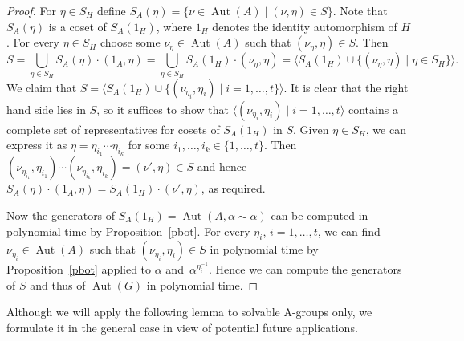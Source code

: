 \documentclass{article}
\DeclareMathOperator{\Aut}{Aut}
\begin{document}
\begin{proof}
	For \( \eta \in S_H \) define \( S_A(\eta) = \{ \nu \in \Aut(A) \mid (\nu, \eta) \in S \} \).
	Note that \( S_A(\eta) \) is a coset of \( S_A(1_H) \), where \( 1_H \) denotes the identity automorphism of \( H \).
	For every \( \eta \in S_H \) choose some \( \nu_\eta \in \Aut(A) \) such that \( (\nu_\eta, \eta) \in S \). Then
	\[ S = \bigcup_{\eta \in S_H} S_A(\eta) \cdot (1_A, \eta) = \bigcup_{\eta \in S_H} S_A(1_H) \cdot (\nu_\eta, \eta) =
	\langle S_A(1_H) \cup \{ (\nu_\eta, \eta) \mid \eta \in S_H \} \rangle. \]
	We claim that \( S = \langle S_A(1_H) \cup \{ (\nu_{\eta_i}, \eta_i) \mid i = 1, \dots, t \} \rangle \).
	It is clear that the right hand side lies in \( S \), so it suffices to show that \( \langle (\nu_{\eta_i}, \eta_i) \mid i = 1, \dots, t \rangle \)
	contains a complete set of representatives for cosets of \( S_A(1_H) \) in \( S \).
	Given \( \eta \in S_H \), we can express it as \( \eta = \eta_{i_1} \cdots \eta_{i_k} \) for some \( i_1, \dots, i_k \in \{ 1, \dots, t \} \).
	Then \( (\nu_{\eta_{i_1}}, \eta_{i_1}) \cdots (\nu_{\eta_{i_k}}, \eta_{i_k}) = (\nu', \eta) \in S \) and hence
	\( S_A(\eta) \cdot (1_A, \eta) = S_A(1_H) \cdot (\nu', \eta) \), as required.

	Now the generators of \( S_A(1_H) = \Aut(A, \alpha \sim \alpha) \) can be computed in polynomial time by Proposition~\ref{pbot}.
	For every \( \eta_i \), \( i = 1, \dots, t \), we can find \( \nu_{\eta_i} \in \Aut(A) \) such that \( (\nu_{\eta_i}, \eta_i) \in S \)
	in polynomial time by Proposition~\ref{pbot} applied to \( \alpha \) and~\( \alpha^{\eta_i^{-1}} \).
	Hence we can compute the generators of \( S \) and thus of \( \Aut(G) \) in polynomial time.
\end{proof}

Although we will apply the following lemma to solvable A-groups only, we formulate it in the general case
in view of potential future applications.
\end{document}
